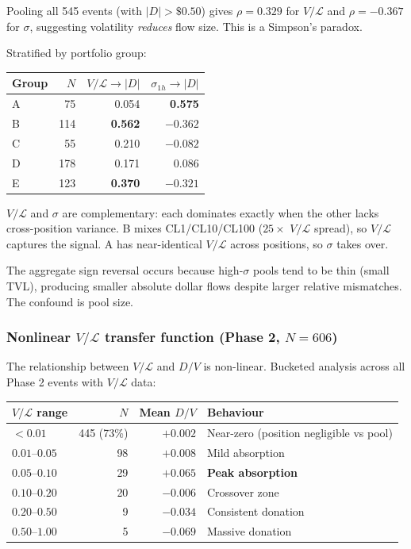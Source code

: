 \documentclass[11pt,a4paper]{article}
\begin{document}
Pooling all 545 events (with $|D| > \$0.50$) gives $\rho = 0.329$ for $V/\mathcal{L}$ and $\rho = -0.367$ for $\sigma$, suggesting volatility \emph{reduces} flow size. This is a Simpson's paradox.

Stratified by portfolio group:

\begin{table}[H]
\centering
\begin{tabular}{@{}lrrr@{}}
\toprule
Group & $N$ & $V/\mathcal{L} \to |D|$ & $\sigma_{1h} \to |D|$ \\
\midrule
A & 75  & 0.054           & \textbf{0.575} \\
B & 114 & \textbf{0.562}  & $-0.362$ \\
C & 55  & 0.210           & $-0.082$ \\
D & 178 & 0.171           & $0.086$ \\
E & 123 & \textbf{0.370}  & $-0.321$ \\
\bottomrule
\end{tabular}
\end{table}

$V/\mathcal{L}$ and $\sigma$ are complementary: each dominates exactly when the other lacks cross-position variance. B mixes CL1/CL10/CL100 ($25\times$ $V/\mathcal{L}$ spread), so $V/\mathcal{L}$ captures the signal. A has near-identical $V/\mathcal{L}$ across positions, so $\sigma$ takes over.

The aggregate sign reversal occurs because high-$\sigma$ pools tend to be thin (small TVL), producing smaller absolute dollar flows despite larger relative mismatches. The confound is pool size.

\subsubsection*{Nonlinear $V/\mathcal{L}$ transfer function (Phase 2, $N = 606$)}

The relationship between $V/\mathcal{L}$ and $D/V$ is non-linear. Bucketed analysis across all Phase 2 events with $V/\mathcal{L}$ data:

\begin{table}[H]
\centering
\begin{tabular}{@{}lrrl@{}}
\toprule
$V/\mathcal{L}$ range & $N$ & Mean $D/V$ & Behaviour \\
\midrule
$< 0.01$       & 445 (73\%) & $+0.002$ & Near-zero (position negligible vs pool) \\
$0.01$--$0.05$ & 98         & $+0.008$ & Mild absorption \\
$0.05$--$0.10$ & 29         & $+0.065$ & \textbf{Peak absorption} \\
$0.10$--$0.20$ & 20         & $-0.006$ & Crossover zone \\
$0.20$--$0.50$ & 9          & $-0.034$ & Consistent donation \\
$0.50$--$1.00$ & 5          & $-0.069$ & Massive donation \\
\bottomrule
\end{tabular}
\end{table}
\end{document}
